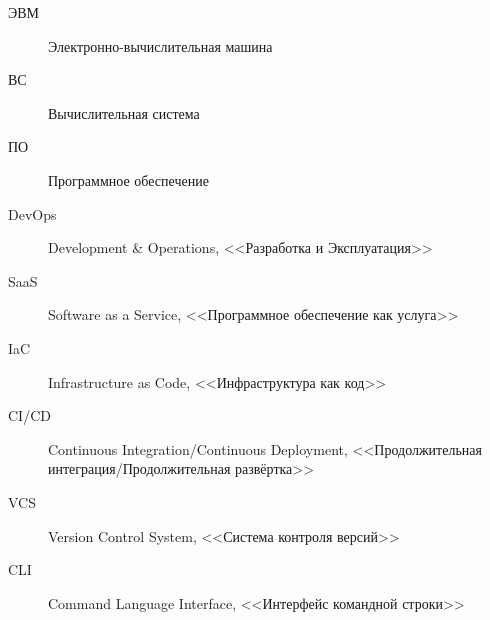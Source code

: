 \Abbreviations %
\begin{description}
    \item[ЭВМ] Электронно-вычислительная машина
    \item[ВС] Вычислительная система
    \item[ПО] Программное обеспечение
    \item[DevOps] Development & Operations, <<Разработка и Эксплуатация>>
    \item[SaaS] Software as a Service, <<Программное обеспечение как услуга>>
    \item[IaC] Infrastructure as Code, <<Инфраструктура как код>>
    \item[CI/CD] Continuous Integration/Continuous Deployment, <<Продолжительная интеграция/Продолжительная развёртка>>
    \item[VCS] Version Control System, <<Система контроля версий>>
    \item[CLI] Command Language Interface, <<Интерфейс командной строки>>
\end{description}


